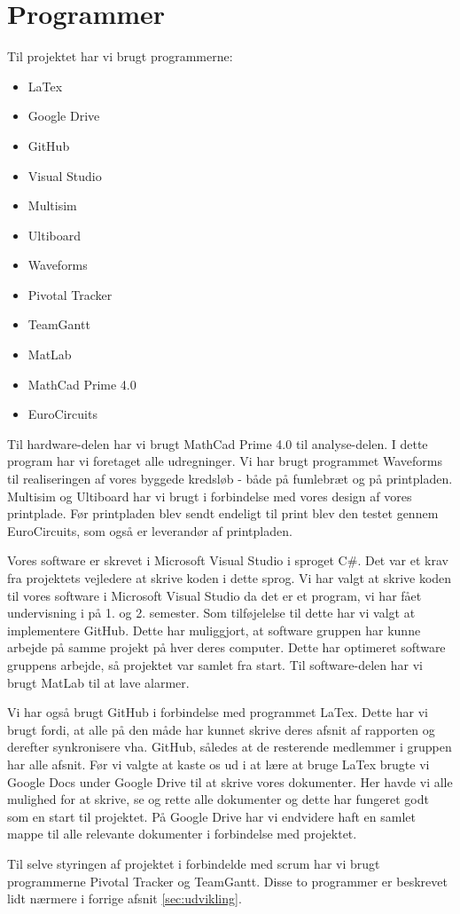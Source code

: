 \section{Programmer}

Til projektet har vi brugt programmerne: 

\begin{itemize}
	\item LaTex
	\item Google Drive
	\item GitHub
	\item Visual Studio
	\item Multisim
	\item Ultiboard
	\item Waveforms
	\item Pivotal Tracker
	\item TeamGantt
	\item MatLab
	\item MathCad Prime 4.0
	\item EuroCircuits 
\end{itemize}

Til hardware-delen har vi brugt MathCad Prime 4.0 til analyse-delen. I dette program har vi foretaget alle udregninger. Vi har brugt programmet Waveforms til realiseringen af vores byggede kredsløb - både på fumlebræt og på printpladen. 
Multisim og Ultiboard har vi brugt i forbindelse med vores design af vores printplade. Før printpladen blev sendt endeligt til print blev den testet gennem EuroCircuits, som også er leverandør af printpladen. 

Vores software er skrevet i Microsoft Visual Studio i sproget C\#. Det var et krav fra projektets vejledere at skrive koden i dette sprog. Vi har valgt at skrive koden til vores software i Microsoft Visual Studio da det er et program, vi har fået undervisning i på 1. og 2. semester. Som tilføjelelse til dette har vi valgt at implementere GitHub. Dette har muliggjort, at software gruppen har kunne arbejde på samme projekt på hver deres computer. Dette har optimeret software gruppens arbejde, så projektet var samlet fra start. Til software-delen har vi brugt MatLab til at lave alarmer.

Vi har også brugt GitHub i forbindelse med programmet LaTex. Dette har vi brugt fordi, at alle på den måde har kunnet skrive deres afsnit af rapporten og derefter synkronisere vha. GitHub, således at de resterende medlemmer i gruppen har alle afsnit.
Før vi valgte at kaste os ud i at lære at bruge LaTex brugte vi Google Docs under Google Drive til at skrive vores dokumenter. Her havde vi alle mulighed for at skrive, se og rette alle dokumenter og dette har fungeret godt som en start til projektet. På Google Drive har vi endvidere haft en samlet mappe til alle relevante dokumenter i forbindelse med projektet. 

Til selve styringen af projektet i forbindelde med scrum har vi brugt programmerne Pivotal Tracker og TeamGantt. Disse to programmer er beskrevet lidt nærmere i forrige afsnit \vref{sec:udvikling}. 
